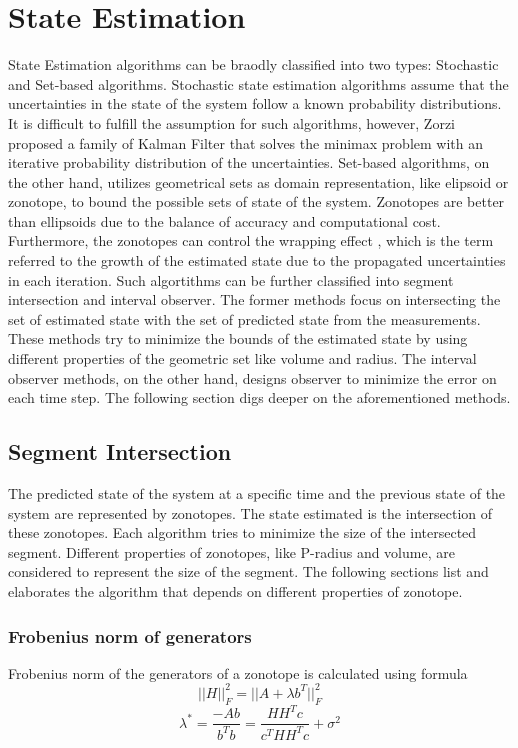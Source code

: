 \chapter{State Estimation} \label{ch:state_estimation}
State Estimation algorithms can be braodly classified into two types: Stochastic and Set-based algorithms. Stochastic state estimation algorithms assume that the uncertainties in the state of the system follow  a known probability distributions. It is difficult to fulfill the assumption for such algorithms, however, Zorzi \cite{Zorzi2017} proposed a family of Kalman Filter that solves the minimax problem with an iterative probability distribution of the uncertainties. Set-based algorithms, on the other hand, utilizes geometrical sets as domain representation, like elipsoid or zonotope, to bound the possible sets of state of the system. Zonotopes are better than ellipsoids due to the balance of accuracy and computational cost. Furthermore, the zonotopes can control the wrapping effect \cite{Kuhn1998}, which is the term referred to the growth of the estimated state due to the propagated uncertainties in each iteration. Such algortithms can be further classified into segment intersection and interval observer. The former methods focus on intersecting the set of estimated state with the set of predicted state from the measurements. These methods try to minimize the bounds of the estimated state by using different properties of the geometric set like volume and radius. The interval observer methods, on the other hand, designs observer to minimize the error on each time step. The following section digs deeper on the aforementioned methods.

\section{Segment Intersection} 
The predicted state of the system at a specific time and the previous state of the system are represented by zonotopes. The state estimated is the intersection of these zonotopes. Each algorithm tries to minimize the size of the intersected segment. Different properties of zonotopes, like P-radius and volume, are considered to represent the size of the segment. The following sections list and elaborates the algorithm that depends on different properties of zonotope.

\subsection{Frobenius norm of generators}
Frobenius norm of the generators of a zonotope is calculated using formula
\begin{equation}
||H||_{F}^2 = ||A + \lambda b^T||^{2}_F
\end{equation}
\begin{equation}
\label{lambdaformula}
\lambda^* = \frac{-Ab }{b^Tb}  = \frac{HH^Tc}{c^T HH^Tc} + \sigma^2
\end{equation}

